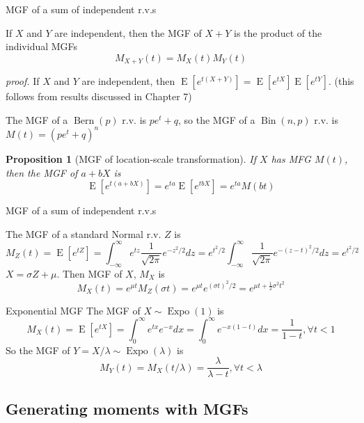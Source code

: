 \documentclass[8pt]{beamer}
\newtheorem{proposition}[theorem]{Proposition}
\newcommand{\ti}[1]{\textit{#1}}
\newcommand{\myber}[1]{\operatorname{Bern}\!\left(#1\right)}
\newcommand{\mybin}[2]{\operatorname{Bin}\!\left(#1,#2\right)}
\newcommand{\myexpo}[1]{\operatorname{Expo}\!\left(#1\right)}
\newcommand{\expec}[1]{\operatorname{E}\left[ #1 \right]}
\begin{document}
\begin{frame}{MGF of a sum of independent r.v.s}
    \begin{theorem}
        If $X$ and $Y$ are independent, then the MGF of $X + Y$ is the product of the individual MGFs
        \[
        M_{X+Y} (t) = M_X (t) M_Y (t)
        \]
    \end{theorem}
    \ti{proof.} If $X$ and $Y$ are independent, then $\expec{e^{t (X+Y)}} = \expec{e^{tX}} \expec{e^{tY}}$. (this follows from results discussed in Chapter 7)

    \begin{example}
        The MGF of a $\myber{p}$ r.v. is $pe^t +q$, so the MGF of a $\mybin{n}{p}$ r.v. is $M(t) = (pe^t + q)^n$
    \end{example}

    \begin{proposition}[MGF of location-scale transformation]
        If $X$ has MFG $M(t)$, then the MGF of $a + bX$ is 
        \[
            \expec{e^{t(a+bX)}} = e^{ta}\expec{e^{tbX}} = e^{ta}M(bt)
        \]
    \end{proposition}
\end{frame}

\begin{frame}{MGF of a sum of independent r.v.s}
    \begin{example}
        The MGF of a standard Normal r.v. $Z$ is 
        \[
        M_Z(t) = \expec{e^{tZ}} = \int_{-\infty}^\infty e^{tz} \frac{1}{\sqrt{2\pi}} e^{-z^2/2} dz = e^{t^2 /2} \int_{-\infty}^\infty \frac{1}{\sqrt{2\pi}} e^{-(z - t)^2 / 2}dz = e^{t^2/ 2}
        \]
        $X = \sigma Z + \mu$. Then MGF of $X$, $M_X$ is 
        \[
        M_X(t) = e^{\mu t} M_Z(\sigma t) = e^{\mu t} e^{(\sigma t)^2/2} = e^{\mu t + \frac{1}{2} \sigma^2 t^2} 
        \]
    \end{example}

    \begin{example}{Exponential MGF}
        The MGF of $X \sim \myexpo{1}$ is
        \[
            M_X(t) = \expec{e^{tX}} = \int_{0}^\infty e^{tx} e^{-x} dx = \int_{0}^\infty e^{-x(1 -t)} dx = \frac{1}{1 - t}, \forall t < 1
        \]
        So the MGF of $Y = X /\lambda \sim \myexpo{\lambda}$ is
        \[
        M_Y (t) = M_X(t / \lambda) = \frac{\lambda}{\lambda - t}, \forall t <\lambda
        \]
    \end{example}
\end{frame}

\subsection{Generating moments with MGFs}
\end{document}
